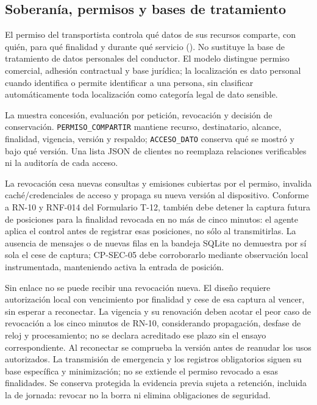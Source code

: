 \FloatBarrier
\subsection{Soberanía, permisos y bases de tratamiento}\label{sec:5-soberania}\label{sec:05-soberania-permisos-y-bases-de-tratamiento}

El permiso del transportista controla qué datos de sus recursos comparte, con quién, para qué finalidad y durante qué servicio (). No sustituye la base de tratamiento de datos personales del conductor. El modelo distingue permiso comercial, adhesión contractual y base jurídica; la localización es dato personal cuando identifica o permite identificar a una persona, sin clasificar automáticamente toda localización como categoría legal de dato sensible.

La  muestra concesión, evaluación por petición, revocación y decisión de conservación. \texttt{PERMISO\_\allowbreak{}COMPARTIR} mantiene recurso, destinatario, alcance, finalidad, vigencia, versión y respaldo; \texttt{ACCESO\_\allowbreak{}DATO} conserva qué se mostró y bajo qué versión. Una lista JSON de clientes no reemplaza relaciones verificables ni la auditoría de cada acceso.


La revocación cesa nuevas consultas y emisiones cubiertas por el permiso, invalida caché/credenciales de acceso y propaga su nueva versión al dispositivo. Conforme a RN-10 y RNF-014 del Formulario T-12, también debe detener la captura futura de posiciones para la finalidad revocada en no más de cinco minutos: el agente aplica el control antes de registrar esas posiciones, no sólo al transmitirlas. La ausencia de mensajes o de nuevas filas en la bandeja SQLite no demuestra por sí sola el cese de captura; CP-SEC-05 debe corroborarlo mediante observación local instrumentada, manteniendo activa la entrada de posición.

Sin enlace no se puede recibir una revocación nueva. El diseño requiere autorización local con vencimiento por finalidad y cese de esa captura al vencer, sin esperar a reconectar. La vigencia y su renovación deben acotar el peor caso de revocación a los cinco minutos de RN-10, considerando propagación, desfase de reloj y procesamiento; no se declara acreditado ese plazo sin el ensayo correspondiente. Al reconectar se comprueba la versión antes de reanudar los usos autorizados. La transmisión de emergencia y los registros obligatorios siguen su base específica y minimización; no se extiende el permiso revocado a esas finalidades. Se conserva protegida la evidencia previa sujeta a retención, incluida la de jornada: revocar no la borra ni elimina obligaciones de seguridad.

